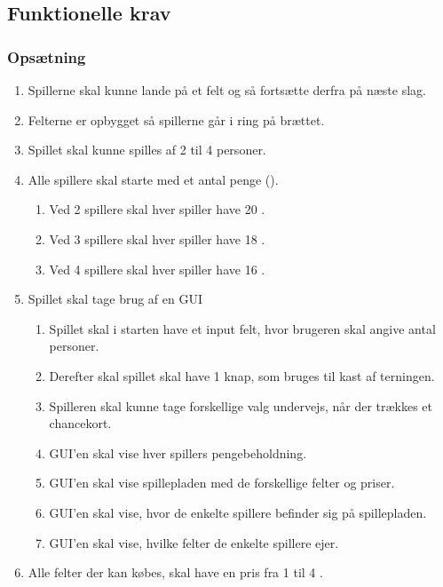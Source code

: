 \subsection{Funktionelle krav}
\subsubsection{Opsætning}
\begin{enumerate}
  \item Spillerne skal kunne lande på et felt og så fortsætte derfra på næste slag. 
  \item Felterne er opbygget så spillerne går i ring på brættet.
  \item Spillet skal kunne spilles af 2 til 4 personer.
  \item Alle spillere skal starte med et antal penge
  ({}).
  
  \begin{enumerate}
      \item Ved 2 spillere skal hver spiller have 20 {}.
      \item Ved 3 spillere skal hver spiller have 18 {}.
      \item Ved 4 spillere skal hver spiller have 16 {}.
  \end{enumerate}
  
  \item Spillet skal tage brug af en GUI
  \begin{enumerate}
      \item Spillet skal i starten have et input felt, hvor brugeren skal angive antal personer.
      \item Derefter skal spillet skal have 1 knap, som bruges til kast af terningen.
      \item Spilleren skal kunne tage forskellige valg undervejs, når der trækkes et chancekort.
      \item GUI'en skal vise hver spillers pengebeholdning.
      \item GUI'en skal vise spillepladen med de forskellige felter og priser.
      \item GUI'en skal vise, hvor de enkelte spillere befinder sig på spillepladen.
      \item GUI'en skal vise, hvilke felter de enkelte spillere ejer.
  \end{enumerate}
  \item Alle felter der kan købes, skal have en pris fra 1 til 4 {}.
\end{enumerate}




